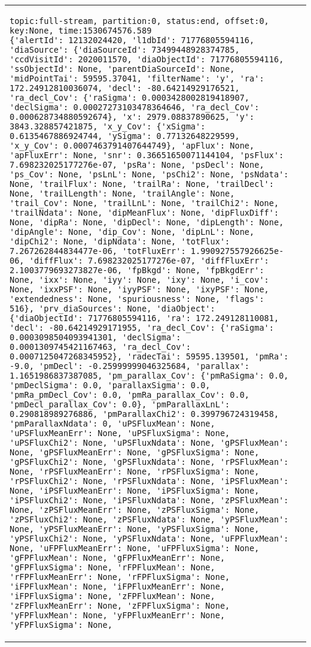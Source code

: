 \documentclass[DM,lsstdraft,STR,toc]{lsstdoc}
\begin{document}
\begin{longtable}{p{2cm}p{14cm}}
\begin{verbatim}
topic:full-stream, partition:0, status:end, offset:0, key:None, time:1530674576.589
{'alertId': 12132024420, 'l1dbId': 71776805594116, 'diaSource': {'diaSourceId': 73499448928374785, 'ccdVisitId': 2020011570, 'diaObjectId': 71776805594116, 'ssObjectId': None, 'parentDiaSourceId': None, 'midPointTai': 59595.37041, 'filterName': 'y', 'ra': 172.24912810036074, 'decl': -80.64214929176521, 'ra_decl_Cov': {'raSigma': 0.0003428002819418907, 'declSigma': 0.00027273103478364646, 'ra_decl_Cov': 0.000628734880592674}, 'x': 2979.08837890625, 'y': 3843.328857421875, 'x_y_Cov': {'xSigma': 0.6135467886924744, 'ySigma': 0.77132648229599, 'x_y_Cov': 0.0007463791407644749}, 'apFlux': None, 'apFluxErr': None, 'snr': 0.36651650071144104, 'psFlux': 7.698232025177276e-07, 'psRa': None, 'psDecl': None, 'ps_Cov': None, 'psLnL': None, 'psChi2': None, 'psNdata': None, 'trailFlux': None, 'trailRa': None, 'trailDecl': None, 'trailLength': None, 'trailAngle': None, 'trail_Cov': None, 'trailLnL': None, 'trailChi2': None, 'trailNdata': None, 'dipMeanFlux': None, 'dipFluxDiff': None, 'dipRa': None, 'dipDecl': None, 'dipLength': None, 'dipAngle': None, 'dip_Cov': None, 'dipLnL': None, 'dipChi2': None, 'dipNdata': None, 'totFlux': 7.267262844834477e-06, 'totFluxErr': 1.990927557926625e-06, 'diffFlux': 7.698232025177276e-07, 'diffFluxErr': 2.1003779693273827e-06, 'fpBkgd': None, 'fpBkgdErr': None, 'ixx': None, 'iyy': None, 'ixy': None, 'i_cov': None, 'ixxPSF': None, 'iyyPSF': None, 'ixyPSF': None, 'extendedness': None, 'spuriousness': None, 'flags': 516}, 'prv_diaSources': None, 'diaObject': {'diaObjectId': 71776805594116, 'ra': 172.249128110081, 'decl': -80.64214929171955, 'ra_decl_Cov': {'raSigma': 0.0003098504093941301, 'declSigma': 0.0001309745421167463, 'ra_decl_Cov': 0.0007125047268345952}, 'radecTai': 59595.139501, 'pmRa': -9.0, 'pmDecl': -0.25999999046325684, 'parallax': 1.1651986837387085, 'pm_parallax_Cov': {'pmRaSigma': 0.0, 'pmDeclSigma': 0.0, 'parallaxSigma': 0.0, 'pmRa_pmDecl_Cov': 0.0, 'pmRa_parallax_Cov': 0.0, 'pmDecl_parallax_Cov': 0.0}, 'pmParallaxLnL': 0.290818989276886, 'pmParallaxChi2': 0.399796724319458, 'pmParallaxNdata': 0, 'uPSFluxMean': None, 'uPSFluxMeanErr': None, 'uPSFluxSigma': None, 'uPSFluxChi2': None, 'uPSFluxNdata': None, 'gPSFluxMean': None, 'gPSFluxMeanErr': None, 'gPSFluxSigma': None, 'gPSFluxChi2': None, 'gPSFluxNdata': None, 'rPSFluxMean': None, 'rPSFluxMeanErr': None, 'rPSFluxSigma': None, 'rPSFluxChi2': None, 'rPSFluxNdata': None, 'iPSFluxMean': None, 'iPSFluxMeanErr': None, 'iPSFluxSigma': None, 'iPSFluxChi2': None, 'iPSFluxNdata': None, 'zPSFluxMean': None, 'zPSFluxMeanErr': None, 'zPSFluxSigma': None, 'zPSFluxChi2': None, 'zPSFluxNdata': None, 'yPSFluxMean': None, 'yPSFluxMeanErr': None, 'yPSFluxSigma': None, 'yPSFluxChi2': None, 'yPSFluxNdata': None, 'uFPFluxMean': None, 'uFPFluxMeanErr': None, 'uFPFluxSigma': None, 'gFPFluxMean': None, 'gFPFluxMeanErr': None, 'gFPFluxSigma': None, 'rFPFluxMean': None, 'rFPFluxMeanErr': None, 'rFPFluxSigma': None, 'iFPFluxMean': None, 'iFPFluxMeanErr': None, 'iFPFluxSigma': None, 'zFPFluxMean': None, 'zFPFluxMeanErr': None, 'zFPFluxSigma': None, 'yFPFluxMean': None, 'yFPFluxMeanErr': None, 'yFPFluxSigma': None, 
\end{verbatim}
\end{longtable}
\end{document}
